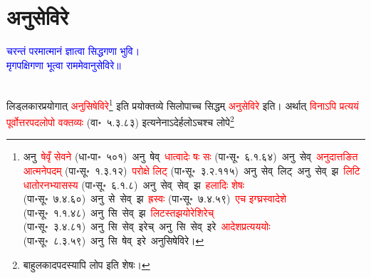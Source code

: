 \section[अनुसेविरे]{अनुसेविरे}
\centering\textcolor{blue}{चरन्तं परमात्मानं ज्ञात्वा सिद्धगणा भुवि।\nopagebreak\\
मृगपक्षिगणा भूत्वा राममेवानुसेविरे॥}\nopagebreak\\
\\
\fontsize{14}{21}\selectfont\begin{sloppypar}\justifying\noindent\hspace{10mm}
लिड्लकार\-प्रयोगात् \textcolor{red}{अनुसिषेविरे}\footnote{अनु~\textcolor{red}{षेवृँ सेवने} (धा॰पा॰~५०१)~\arrow अनु~षेव्~\arrow \textcolor{red}{धात्वादेः षः सः} (पा॰सू॰~६.१.६४)~\arrow अनु~सेव्~\arrow \textcolor{red}{अनुदात्तङित आत्मने\-पदम्} (पा॰सू॰~१.३.१२)~\arrow \textcolor{red}{परोक्षे लिट्} (पा॰सू॰~३.२.११५)~\arrow अनु~सेव्~लिट्~\arrow अनु~सेव्~झ~\arrow \textcolor{red}{लिटि धातोरनभ्यासस्य} (पा॰सू॰~६.१.८)~\arrow अनु~सेव्~सेव्~झ~\arrow \textcolor{red}{हलादिः शेषः} (पा॰सू॰~७.४.६०)~\arrow अनु~से~सेव्~झ~\arrow \textcolor{red}{ह्रस्वः} (पा॰सू॰~७.४.५९)~\arrow \textcolor{red}{एच इग्घ्रस्वादेशे} (पा॰सू॰~१.१.४८)~\arrow अनु~सि~सेव्~झ~\arrow \textcolor{red}{लिटस्तझयोरेशिरेच्} (पा॰सू॰~३.४.८१)~\arrow अनु~सि~सेव्~इरेच्~\arrow अनु~सि~सेव्~इरे~\arrow \textcolor{red}{आदेश\-प्रत्यययोः} (पा॰सू॰~८.३.५९)~\arrow अनु~सि~षेव्~इरे~\arrow अनुसिषेविरे।} इति प्रयोक्तव्ये सिलोपाच्च सिद्धम् \textcolor{red}{अनुसेविरे} इति। 
अर्थात् \textcolor{red}{विनाऽपि प्रत्ययं पूर्वोत्तर\-पद\-लोपो वक्तव्यः} (वा॰~५.३.८३) इत्यनेनाऽदेर्हलोऽचश्च लोपे\footnote{बाहुलकादपदस्यापि लोप इति शेषः।} 

\end{sloppypar}
